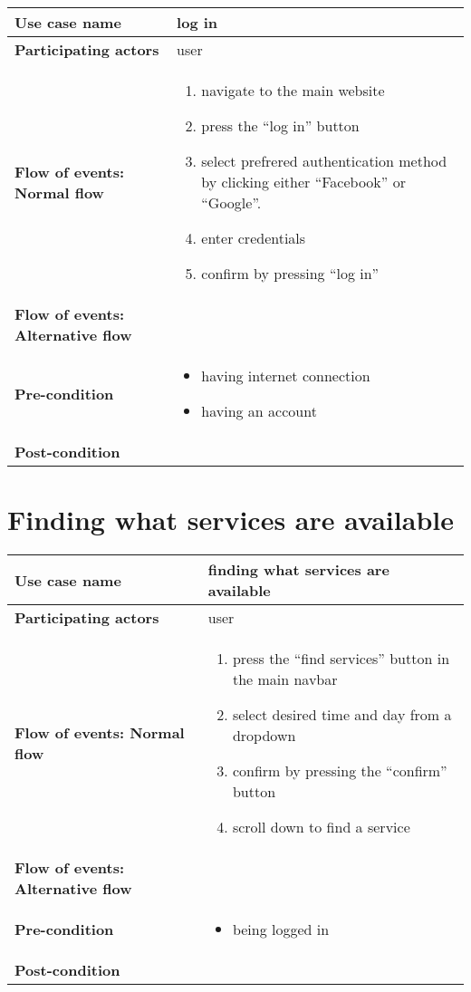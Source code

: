 \documentclass[a4paper, 13pt, draft]{report}
\begin{document}
\begin{center}
    \begin{tabular}{| >{\bf}l | p{5.55cm} |} 
	\hline
	Use case name & log in \\ 
	\hline
	Participating actors & user \\
	\hline
	Flow of events: Normal flow & 
	\begin{enumerate}		
	    \item navigate to the main website
	    \item press the ``log in'' button
	    \item select prefrered authentication method by clicking either ``Facebook'' or ``Google''.
	    \item enter credentials
	    \item confirm by pressing ``log in''
	\end{enumerate}	\\
	\hline
	Flow of events: Alternative flow & \notapplicable \\
	\hline
	Pre-condition & 
	\begin{itemize} 
	    \item having internet connection
	    \item having an account
	\end{itemize} \\
	\hline
	Post-condition & \notapplicable \\
	\hline
    \end{tabular}
\end{center}

\section*{Finding what services are available}

\begin{center}
    \begin{tabular}{| >{\bf}l | p{5.55cm} |} 
	\hline
	Use case name & finding what services are available \\ 
	\hline
	Participating actors & user \\
	\hline
	Flow of events: Normal flow & 
	\begin{enumerate}		
	    \item press the ``find services'' button in the main navbar
	    \item select desired time and day from a dropdown
	    \item confirm by pressing the ``confirm'' button
	    \item scroll down to find a service
	\end{enumerate}	\\
	\hline
	Flow of events: Alternative flow & \notapplicable \\
	\hline
	Pre-condition & 
	\begin{itemize} 
	    \item being logged in
	\end{itemize} \\
	\hline
	Post-condition & \notapplicable \\
	\hline
    \end{tabular}
\end{center}
\end{document}
